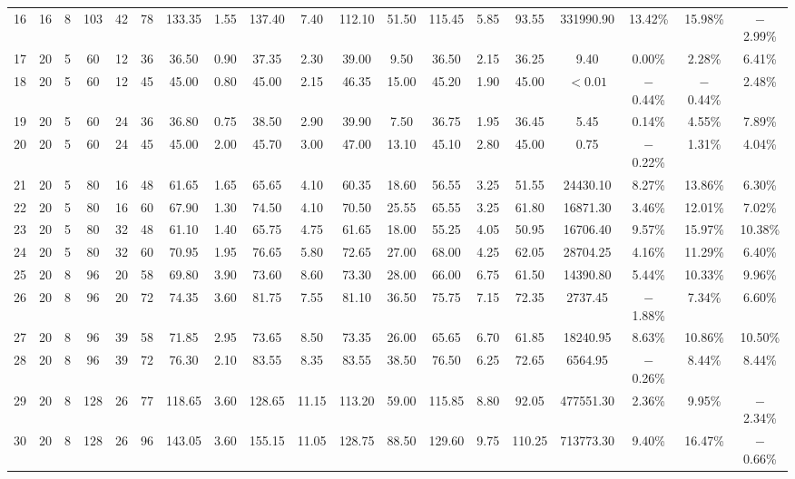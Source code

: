 \documentclass[review,3p,times,12pt,number]{elsarticle}\usepackage{amsmath}\usepackage{amssymb}
\begin{document}
\begin{landscape}
\begin{table}[htbp]
\begin{tabular}{ccccccccccccccccccc}
16& 16 & 8 & 103 & 42 & 78 & 133.35 & 1.55 & 137.40 & 7.40  & 112.10& 51.50 &115.45 & 5.85   & 93.55 & 331990.90 &13.42\% & 15.98\% & $-$2.99\%\\
17& 20 & 5 & 60  & 12 & 36 & 36.50  & 0.90 & 37.35  & 2.30  & 39.00 & 9.50  &36.50  & 2.15   & 36.25 & 9.40      &0.00\%       & 2.28\%  & 6.41\%\\
18& 20 & 5 & 60  & 12 & 45 & 45.00  & 0.80 & 45.00  & 2.15  & 46.35 & 15.00 &45.20  & 1.90   & 45.00 & $<0.01$   &$-$0.44\% & $-$0.44\% & 2.48\%\\
19& 20 & 5 & 60  & 24 & 36 & 36.80  & 0.75 & 38.50  & 2.90  & 39.90 & 7.50  &36.75  & 1.95   & 36.45 & 5.45      &0.14\%  & 4.55\%  & 7.89\%\\
20& 20 & 5 & 60  & 24 & 45 & 45.00  & 2.00 & 45.70  & 3.00  & 47.00 & 13.10  &45.10  & 2.80   & 45.00 & 0.75      &$-$0.22\% & 1.31\%  & 4.04\%\\
21& 20 & 5 & 80  & 16 & 48 & 61.65  & 1.65 & 65.65  & 4.10  & 60.35 & 18.60  &56.55  & 3.25   & 51.55 & 24430.10  &8.27\%  & 13.86\% & 6.30\%\\
22& 20 & 5 & 80  & 16 & 60 & 67.90  & 1.30 & 74.50  & 4.10  & 70.50 & 25.55 &65.55  & 3.25   & 61.80 & 16871.30  & 3.46\% & 12.01\% & 7.02\%\\
23& 20 & 5 & 80  & 32 & 48 & 61.10  & 1.40 & 65.75  & 4.75  & 61.65 & 18.00 &55.25  & 4.05   & 50.95 & 16706.40  & 9.57\% & 15.97\% & 10.38\%\\
24& 20 & 5 & 80  & 32 & 60 & 70.95  & 1.95 & 76.65  & 5.80  & 72.65 & 27.00 &68.00  & 4.25   & 62.05 & 28704.25  & 4.16\% & 11.29\% & 6.40\%\\
25& 20 & 8 & 96  & 20 & 58 & 69.80  & 3.90 & 73.60  & 8.60  & 73.30 & 28.00 &66.00  & 6.75   & 61.50 & 14390.80  & 5.44\% & 10.33\% & 9.96\%\\
26& 20 & 8 & 96  & 20 & 72 & 74.35  & 3.60 & 81.75  & 7.55  & 81.10 & 36.50 &75.75  & 7.15   & 72.35 & 2737.45   & $-$1.88\%& 7.34\%  & 6.60\%\\
27& 20 & 8 & 96  & 39 & 58 & 71.85  & 2.95 & 73.65  & 8.50  & 73.35 & 26.00 &65.65  & 6.70   & 61.85 & 18240.95  &8.63\%  & 10.86\% & 10.50\%\\
28& 20 & 8 & 96  & 39 & 72 & 76.30  & 2.10 & 83.55  & 8.35  & 83.55 & 38.50 &76.50  & 6.25   & 72.65 & 6564.95   &$-$0.26\% & 8.44\%  & 8.44\%\\
29& 20 & 8 & 128 & 26 & 77 & 118.65 & 3.60 & 128.65 & 11.15 & 113.20 & 59.00 &115.85 & 8.80   & 92.05 & 477551.30 &2.36\%  & 9.95\%  & $-$2.34\%\\
30& 20 & 8 & 128 & 26 & 96 & 143.05 & 3.60 & 155.15 & 11.05 & 128.75& 88.50 &129.60 & 9.75   & 110.25& 713773.30 &9.40\%   & 16.47\% & $-$0.66\%\\

\end{tabular}
\end{table}
\end{landscape}
\end{document}
